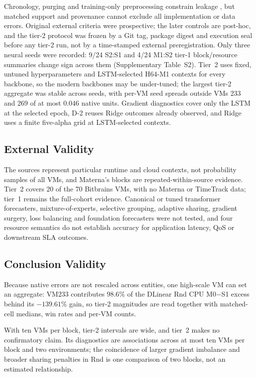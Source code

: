 \documentclass[5p,twocolumn]{elsarticle}
\begin{document}
Chronology, purging and training-only preprocessing constrain leakage
\citep{Cerqueira2020Evaluation,Hyndman2021Forecasting}, but matched support and
provenance cannot exclude all implementation or data errors. Original
external criteria were prospective; the later controls are post-hoc, and the
tier-2 protocol was frozen by a Git tag, package digest and execution seal
before any tier-2 run, not by a time-stamped external preregistration. Only
three neural seeds were recorded: 9/24 S2:S1 and 4/24 M1:S2 tier-1
block/resource summaries change sign across them (Supplementary Table~S2).
Tier~2 uses fixed, untuned hyperparameters and LSTM-selected H64-M1 contexts
for every backbone, so the modern backbones may be under-tuned; the largest
tier-2 aggregate was stable across seeds, with per-VM seed spreads outside
VMs 233 and 269 of at most 0.046 native units. Gradient diagnostics cover
only the LSTM at the selected epoch, D-2 reuses Ridge outcomes already
observed, and Ridge uses a finite five-alpha grid at LSTM-selected contexts.

\subsection{External Validity}
\label{sec:threats-external}

The sources represent particular runtime and cloud contexts, not probability
samples of all VMs, and Materna's blocks are repeated-within-source evidence.
Tier~2 covers 20 of the 70 Bitbrains VMs, with no Materna or TimeTrack data;
tier~1 remains the full-cohort evidence. Canonical or tuned transformer
forecasters, mixture-of-experts, selective grouping, adaptive sharing,
gradient surgery, loss balancing and foundation forecasters were not tested,
and four resource semantics do not establish accuracy for application
latency, QoS or downstream SLA outcomes.

\subsection{Conclusion Validity}
\label{sec:threats-conclusion}

Because native errors are not rescaled across entities, one high-scale VM
can set an aggregate: VM233 contributes $98.6\%$ of the DLinear Rnd CPU
M0$-$S1 excess behind its $-139.61\%$ gain, so tier-2 magnitudes are read
together with matched-cell medians, win rates and per-VM counts.

With ten VMs per block, tier-2 intervals are wide, and tier~2 makes no
confirmatory claim. Its diagnostics are associations across at most ten VMs
per block and two environments; the coincidence of larger gradient
imbalance and broader sharing penalties in Rnd is one comparison of two
blocks, not an estimated relationship.
\end{document}
